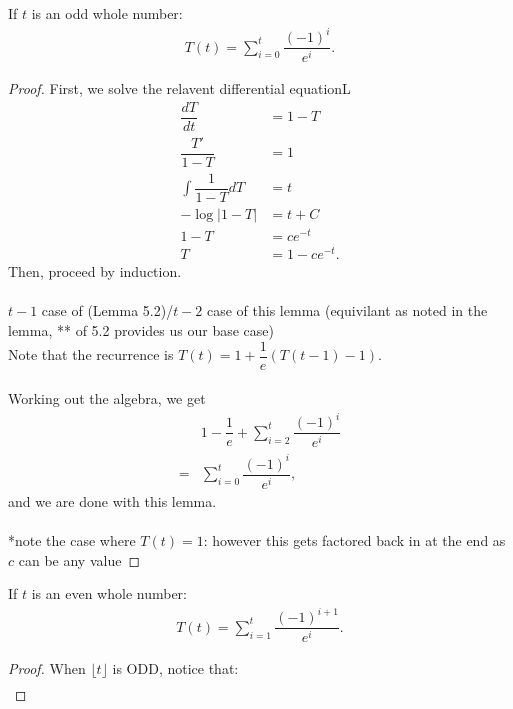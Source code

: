 \documentclass{article}
\begin{document}
\begin{solution*}
    \begin{lemma}
        If $t$ is an odd whole number:
        \begin{align*}
            T(t) = \sum_{i=0}^{t} \dfrac{(-1)^i}{e^i}.
        \end{align*}
    \end{lemma}
    \begin{proof}
        First, we solve the relavent differential equationL
        \begin{align*}
            \dfrac{dT}{dt} &= 1- T \\ 
            \dfrac{T'}{1-T} &= 1 \\ 
            \int \dfrac{1}{1-T} dT &= t \\
            -\log |1-T| &= t + C \\ 
            1-T &= ce^{-t} \\ 
            T &= 1-ce^{-t}.
        \end{align*}
        Then, proceed by induction. \\~\\ 
        \IHID $t-1$ case of (Lemma 5.2)/$t-2$ case of this lemma (equivilant as noted in the lemma, ** of 5.2 provides us our
        base case) \\ 
        \ISID Note that the recurrence is $T(t) = 1 + \dfrac{1}{e}(T(t-1)-1)$. \\~\\ 
        Working out the algebra, we get 
        \begin{align*}
            &1-\dfrac{1}{e} + \sum_{i=2}^{t} \dfrac{(-1)^i}{e^i} \\ 
            =&\sum_{i=0}^{t} \dfrac{(-1)^i}{e^i},
        \end{align*}
        and we are done with this lemma. \\~\\ 
        *note the case where $T(t) = 1$: however this gets factored back in at the end as $c$ can be any value
    \end{proof}
    \begin{lemma}
        If $t$ is an even whole number:
        \begin{align*}
            T(t) = \sum_{i=1}^{t} \dfrac{(-1)^{i+1}}{e^i}.
        \end{align*}
    \end{lemma}
    \begin{proof}
        When $\lfloor t \rfloor$ is ODD, notice that:
        \begin{align*}

\end{align*}
\end{proof}
\end{solution*}
\end{document}
